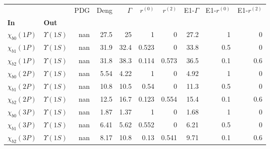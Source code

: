 \begin{tabular}{l|l|r|r|r|r|r|r|r|r}
\toprule
                &                &  PDG &  Deng &  $\Gamma$ &  $r^{(0)}$ &  $r^{(2)}$ &  E1-$\Gamma$ &  E1-$r^{(0)}$ &  E1-$r^{(2)}$ \\
\textbf{In} & \textbf{Out} &      &       &           &            &            &              &               &               \\
\midrule
\textbf{$\chi_{b0}(1P)$} & \textbf{$\Upsilon(1S)$} &  nan &  27.5 &        25 &          1 &          0 &         27.2 &             1 &             0 \\
\textbf{$\chi_{b1}(1P)$} & \textbf{$\Upsilon(1S)$} &  nan &  31.9 &      32.4 &      0.523 &          0 &         33.8 &           0.5 &             0 \\
\textbf{$\chi_{b2}(1P)$} & \textbf{$\Upsilon(1S)$} &  nan &  31.8 &      38.3 &      0.114 &      0.573 &         36.5 &           0.1 &           0.6 \\
\textbf{$\chi_{b0}(2P)$} & \textbf{$\Upsilon(1S)$} &  nan &  5.54 &      4.22 &          1 &          0 &         4.92 &             1 &             0 \\
\textbf{$\chi_{b1}(2P)$} & \textbf{$\Upsilon(1S)$} &  nan &  10.8 &      10.5 &       0.54 &          0 &         11.3 &           0.5 &             0 \\
\textbf{$\chi_{b2}(2P)$} & \textbf{$\Upsilon(1S)$} &  nan &  12.5 &      16.7 &      0.123 &      0.554 &         15.4 &           0.1 &           0.6 \\
\textbf{$\chi_{b0}(3P)$} & \textbf{$\Upsilon(1S)$} &  nan &  1.87 &      1.37 &          1 &          0 &         1.68 &             1 &             0 \\
\textbf{$\chi_{b1}(3P)$} & \textbf{$\Upsilon(1S)$} &  nan &  6.41 &      5.62 &      0.552 &          0 &         6.21 &           0.5 &             0 \\
\textbf{$\chi_{b2}(3P)$} & \textbf{$\Upsilon(1S)$} &  nan &  8.17 &      10.8 &       0.13 &      0.541 &         9.71 &           0.1 &           0.6 \\
\bottomrule
\end{tabular}
